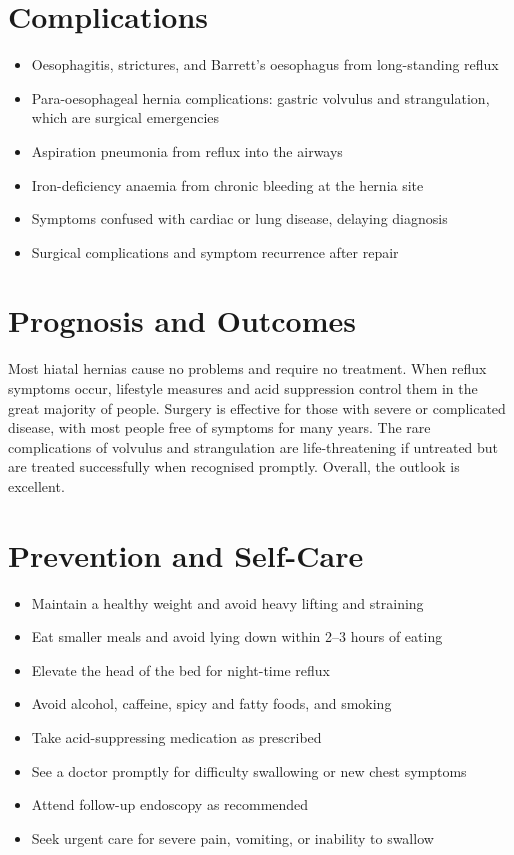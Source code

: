 \section*{Complications}
\begin{itemize}
    \item Oesophagitis, strictures, and Barrett's oesophagus from long-standing reflux
    \item Para-oesophageal hernia complications: gastric volvulus and strangulation, which are surgical emergencies
    \item Aspiration pneumonia from reflux into the airways
    \item Iron-deficiency anaemia from chronic bleeding at the hernia site
    \item Symptoms confused with cardiac or lung disease, delaying diagnosis
    \item Surgical complications and symptom recurrence after repair
\end{itemize}

\section*{Prognosis and Outcomes}
Most hiatal hernias cause no problems and require no treatment. When reflux symptoms occur, lifestyle measures and acid suppression control them in the great majority of people. Surgery is effective for those with severe or complicated disease, with most people free of symptoms for many years. The rare complications of volvulus and strangulation are life-threatening if untreated but are treated successfully when recognised promptly. Overall, the outlook is excellent.

\section*{Prevention and Self-Care}
\begin{itemize}
    \item Maintain a healthy weight and avoid heavy lifting and straining
    \item Eat smaller meals and avoid lying down within 2--3 hours of eating
    \item Elevate the head of the bed for night-time reflux
    \item Avoid alcohol, caffeine, spicy and fatty foods, and smoking
    \item Take acid-suppressing medication as prescribed
    \item See a doctor promptly for difficulty swallowing or new chest symptoms
    \item Attend follow-up endoscopy as recommended
    \item Seek urgent care for severe pain, vomiting, or inability to swallow
\end{itemize}

